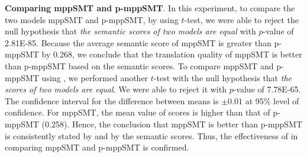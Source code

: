 \textbf{Comparing mppSMT and p-mppSMT}. In this experiment, 
to compare the two models mppSMT and p-mppSMT, by using $t$-test, we
were able to reject the null hypothesis that \textit{the semantic
scores of two models are equal} with $p$-value of 2.81E-85. Because the average semantic score of mppSMT
is greater than p-mppSMT by 0.268, we conclude that the translation
quality of mppSMT is better than p-mppSMT based on the semantic
scores.
%
To compare mppSMT and p-mppSMT using {\model}, we performed another
$t$-test with the null hypothesis that \textit{the {\model} scores of
two models are equal}. We were able to reject it with $p$-value of
7.78E-65. The confidence interval for the difference between means is
$\pm0.01$ at 95\% level of confidence. For mppSMT, the mean value of
{\model} scores is higher than that of p-mppSMT (0.258). Hence, the
conclusion that mppSMT is better than p-mppSMT is consistently stated
by {\model} and by the semantic scores.
Thus, the effectiveness of {\model} in comparing
mppSMT and p-mppSMT is confirmed.

